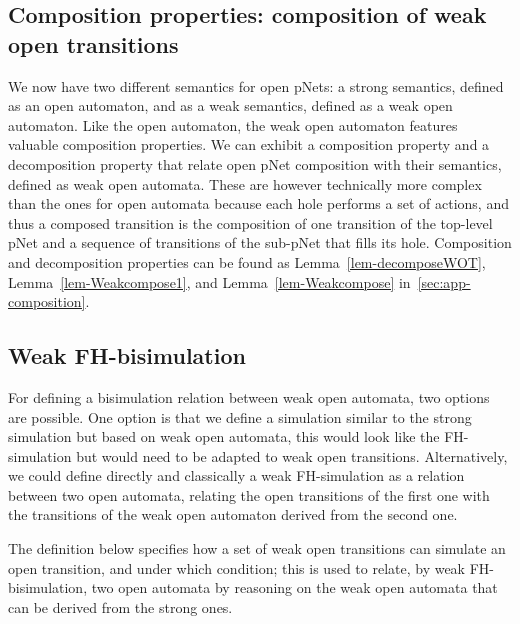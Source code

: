 \documentclass{elsarticle}
\begin{document}
\subsection{Composition properties: composition of weak open transitions}
We now have two different semantics for open pNets: a strong semantics, defined  as an open automaton, and as a weak semantics, defined as a weak open automaton. Like the open automaton, the weak open automaton features valuable composition properties. We can exhibit  a composition property and a decomposition property that relate open pNet composition with their semantics, defined as weak open automata. These are however technically more complex than the ones for open automata because each hole performs a set of actions, and thus a composed transition is the composition of one transition of the top-level pNet and a sequence of transitions of the sub-pNet that fills its hole. Composition and decomposition properties can be found as Lemma~\ref{lem-decomposeWOT}, Lemma~\ref{lem-Weakcompose1}, and Lemma~\ref{lem-Weakcompose} in~\ref{sec:app-composition}.



\subsection{Weak FH-bisimulation}
For defining a bisimulation relation between weak open automata, two options are possible. One option is that we define a simulation similar to the strong simulation but based on weak open automata, this would look like the FH-simulation but would need to be adapted to weak open transitions. Alternatively, we could define directly and classically a weak FH-simulation as a relation between two open automata, relating the open transitions of the first one with the transitions of the weak open automaton derived from the second one. 

The definition below specifies how a set of weak open transitions can simulate an open transition, and under which condition; this is used to relate, by weak FH-bisimulation, two open automata by reasoning on the weak open automata that can be derived from the strong ones.
\end{document}
